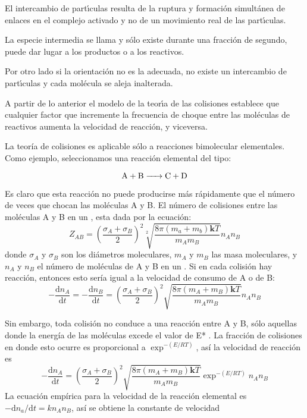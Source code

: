 El intercambio de part\'{\i}culas resulta de la ruptura y formaci\'on simult\'a\-nea de enlaces en el complejo
activado y no de un movimiento real de las part\'{\i}culas.

La especie intermedia se llama \textbf{}
y s\'olo existe durante una fracci\'on de segundo, puede dar
lugar a los productos o a los reactivos.

Por otro lado si la orientaci\'on no es la adecuada, no existe un intercambio de part\'{\i}culas y cada mol\'ecula se aleja inalterada.

A partir de lo anterior el modelo de la teor\'{\i}a de las colisiones establece que cualquier factor que incremente la frecuencia de choque entre las mo\-l\'e\-culas de reactivos aumenta la velocidad de reacci\'on, y viceversa.

La teoría de colisiones es aplicable sólo a reacciones bimolecular elementales. Como ejemplo, seleccionamos una reacción elemental del tipo:

$$\ce{A + B -> C + D}$$

Es claro que esta reacción no puede producirse más rápidamente que el número de veces que chocan las moléculas A y B. El número de colisiones entre las moléculas A y B en un \centi\square\metre\per\second, esta dada por la ecuación:
\begin{equation}
 Z_{AB}= \left( \frac{ \sigma_A+ \sigma_B }{2}\right)^2 \sqrt[2]{\frac{8 \pi(m_a+m_b)\textbf{k}T }{m_Am_B}} n_An_B 
\end{equation}
donde $\sigma_A$ y $\sigma_B$  son los diámetros moleculares, $m_A$ y $m_B$ las masa moleculares, y $n_A$ y $n_B$ el número de moléculas de A y B en un \centi\cubic\metre. Si en cada colisión hay reacción, entonces esto sería igual a la velocidad de consumo de A o de B:
\begin{equation}
 -\frac{\mathrm{d}n_A}{\mathrm{d}t}=-\frac{\mathrm{d}n_B}{\mathrm{d}t}=\left(\frac{ \sigma_A+ \sigma_B }{ 2 }\right)^2 \sqrt{\frac{8 \pi(m_A+m_B)\textbf{k}T }{m_Am_B}}n_An_B 
\end{equation}


Sin embargo, toda colisión no conduce a una reacción entre A y B, sólo aquellas donde la energía de las moléculas excede el valor de E* . La fracción de colisiones en donde esto ocurre es proporcional a \( \exp^{-(E/RT)} \), así  la velocidad de reacción es
\begin{equation}
 -\frac{\mathrm{d}n_A}{\mathrm{d}t}=\left(\frac{ \sigma_A+ \sigma_B }{ 2 }\right)^2 \sqrt{\frac{8 \pi(m_A+m_B)\textbf{k}T }{m_Am_B}} \exp^{-(E/RT)} n_An_B 
\end{equation}
La ecuación empírica para la velocidad de la reacción elemental es \( -\mathrm{d}n_a/\mathrm{d}t=kn_An_B \), así se obtiene la constante de velocidad


